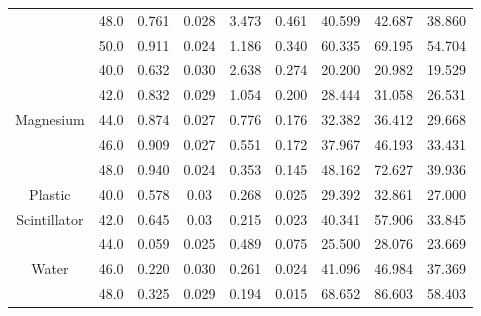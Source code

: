 \begin{tabularx}{1.27\textwidth}{ccccccccc}
    & 48.0 &    0.761 &         0.028 &                  3.473 &                       0.461 &                  40.599 &                      42.687 &                      38.860 \\
    & 50.0 &    0.911 &         0.024 &                  1.186 &                       0.340 &                  60.335 &                      69.195 &                      54.704 \\
    \midrule
    & 40.0 &    0.632 &         0.030 &                  2.638 &                       0.274 &                  20.200 &                      20.982 &                      19.529 \\
    & 42.0 &    0.832 &         0.029 &                  1.054 &                       0.200 &                  28.444 &                      31.058 &                      26.531 \\
    Magnesium& 44.0 &    0.874 &         0.027 &                  0.776 &                       0.176 &                  32.382 &                      36.412 &                      29.668 \\
    & 46.0 &    0.909 &         0.027 &                  0.551 &                       0.172 &                  37.967 &                      46.193 &                      33.431 \\
    & 48.0 &    0.940 &         0.024 &                  0.353 &                       0.145 &                  48.162 &                      72.627 &                      39.936 \\
    \midrule
    Plastic& 40.0 &    0.578 &          0.03 &                  0.268 &                       0.025 &                  29.392 &                      32.861 &                      27.000 \\
    Scintillator& 42.0 &    0.645 &          0.03 &                  0.215 &                       0.023 &                  40.341 &                      57.906 &                      33.845 \\
    \midrule
    & 44.0 &    0.059 &         0.025 &                  0.489 &                       0.075 &                  25.500 &                      28.076 &                      23.669 \\
    Water & 46.0 &    0.220 &         0.030 &                  0.261 &                       0.024 &                  41.096 &                      46.984 &                      37.369 \\
    & 48.0 &    0.325 &         0.029 &                  0.194 &                       0.015 &                  68.652 &                      86.603 &                      58.403 \\
    \bottomrule
\end{tabularx}
